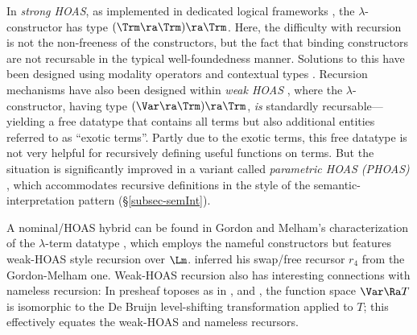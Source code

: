 In \emph{strong HOAS}, %
as implemented in dedicated logical frameworks 
\cite{DBLP:conf/cade/PfenningS99,abellaJournalPaper,beluga}, 
the $\lambda$-constructor has type $(\Trm \ra \Trm) \ra \Trm$. Here, the difficulty with recursion is not the non-freeness of the constructors, but the fact that 
binding constructors are not recursable 
in the typical well-foundedness manner. Solutions to this have been designed using modality operators \cite{DBLP:journals/tcs/SchurmannDP01} and contextual types 
\cite{DBLP:conf/esop/0001P17}.  
Recursion mechanisms have also been designed within \emph{weak HOAS} 
\cite{weakHOAS}, %
where the $\lambda$-constructor, having  
type $(\Var \ra \Trm) \ra \Trm$, \emph{is} standardly recursable---yielding a free datatype that contains %
all terms but also additional entities referred to as ``exotic terms''.  Partly 
due to the exotic terms, this free datatype %
is not 
very %
helpful for recursively defining useful functions on terms. 
But the situation is significantly improved in a variant called %
\emph{parametric HOAS (PHOAS)} \cite{chlipalaParamHOAS2008}, 
which accommodates recursive definitions 
%
in the style of the semantic-interpretation pattern (\S\ref{subsec-semInt}).  

A  nominal/HOAS hybrid can be found in Gordon and Melham's characterization of the $\lambda$-term datatype \cite{DBLP:conf/tphol/GordonM96}, which employs the nameful constructors but %
features weak-HOAS style recursion over $\Lm$.  %
\citet{primrecFOAS-Norrish04} inferred his swap/free 
recursor $r_4$ from the Gordon-Melham one. 
%
Weak-HOAS recursion also 
has interesting connections with nameless recursion: In presheaf toposes as in %
\citet{fio-abs}, %
\citet{DBLP:conf/lics/Hofmann99} and 
\citet{DBLP:conf/icfp/AmblerCM03},  
the function space $\Var \Ra T$ is isomorphic 
to the De Bruijn level-shifting transformation applied to $T$; this effectively equates 
the weak-HOAS and nameless recursors.  
%


